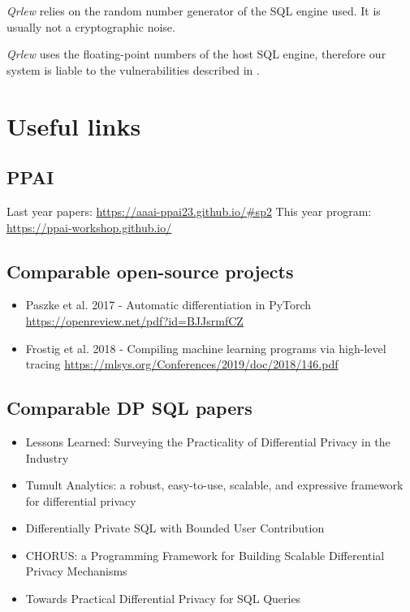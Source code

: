 \documentclass[letterpaper]{article} %
\newcommand{\qrlew}{\emph{Qrlew}}
\begin{document}
\qrlew{} relies on the random number generator of the SQL engine used. It is usually not a cryptographic noise.

\qrlew{} uses the floating-point numbers of the host SQL engine, therefore our system is liable to the vulnerabilities described in \citeauthor{casacuberta2022widespread}.


\section*{Useful links}
\subsection{PPAI}
Last year papers:
\url{https://aaai-ppai23.github.io/#sp2}
This year program:
\url{https://ppai-workshop.github.io/}

\subsection{Comparable open-source projects}

\begin{itemize}
    \item Paszke et al. 2017 - Automatic differentiation in PyTorch \url{https://openreview.net/pdf?id=BJJsrmfCZ}
    \item Frostig et al. 2018 - Compiling machine learning programs via high-level tracing \url{https://mlsys.org/Conferences/2019/doc/2018/146.pdf}
\end{itemize}

\subsection{Comparable DP SQL papers}

\begin{itemize}
    \item Lessons Learned: Surveying the Practicality of Differential Privacy in the Industry \cite{garrido2022lessons}
    \item Tumult Analytics: a robust, easy-to-use, scalable, and expressive framework for differential privacy \cite{berghel2022tumult}
    \item Differentially Private SQL with Bounded User Contribution \cite{wilson2019differentially}
    \item CHORUS: a Programming Framework for Building Scalable Differential Privacy Mechanisms \cite{johnson2020chorus}
    \item Towards Practical Differential Privacy for SQL Queries \cite{johnson2018towards}
\end{itemize}
\end{document}
